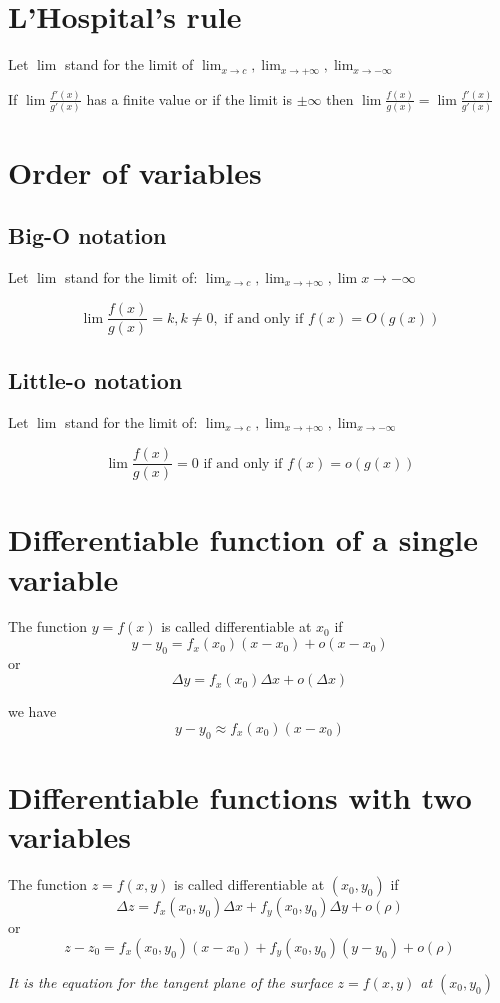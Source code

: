 \section{L'Hospital's rule}
\begin{mythm}
\normalfont Let \(\lim{}\) stand for the limit of \(\lim_{x\to c}, \lim_{x\to +\infty}, \lim_{x\to -\infty}\)

If \(\lim{\frac{f'(x)}{g'(x)}}\) has a finite value or if the limit is \(\pm\infty\) then \(\lim{\frac{f(x)}{g(x)}} = \lim{\frac{f'(x)}{g'(x)}}\)
\end{mythm}

\section{Order of variables}
\subsection{Big-O notation}
\begin{mythm}
\normalfont Let \(\lim{}\) stand for the limit of: \(\lim_{x\to c}, \lim_{x\to+\infty}, \lim{x\to-\infty}\)

\[\lim{\frac{f(x)}{g(x)}=k}, k\ne 0, \text{ if and only if } f(x)=O(g(x))\]
\end{mythm}

\subsection{Little-o notation}
\begin{mythm}
\normalfont Let \(\lim{}\) stand for the limit of: \(\lim_{x\to c}, \lim_{x\to+\infty}, \lim_{x\to-\infty}\)

\[\lim{\frac{f(x)}{g(x)} = 0} \text{ if and only if } f(x) = o(g(x))\]
\end{mythm}

\section{Differentiable function of a single variable}
\begin{mythm}
\normalfont The function \(y=f(x)\) is called differentiable at \(x_0\) if
\[y-y_0 = f_x(x_0)(x-x_0) + o(x-x_0)\]
or
\[\Delta y = f_x(x_0)\Delta x + o(\Delta x)\]

we have
\[y - y_0 \approx f_x(x_0)(x-x_0)\]
\end{mythm}

\section{Differentiable functions with two variables}
\begin{mythm}\normalfont
The function \(z = f(x,y)\) is called differentiable at \((x_0, y_0)\) if
\[\Delta z = f_x(x_0, y_0)\Delta x + f_y(x_0, y_0)\Delta y + o(\rho)\]
or
\[z-z_0=f_x(x_0,y_0)(x-x_0)+f_y(x_0,y_0)(y-y_0)+o(\rho)\]

\textit{It is the equation for the tangent plane of the surface \(z = f(x,y)\) at \((x_0,y_0)\)}
\end{mythm}

